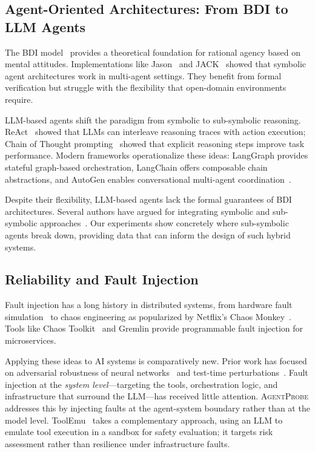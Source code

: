\documentclass[make,article,submit,moreauthors,pdftex]{mdpi}
\providecommand{\agentprobe}{\textsc{AgentProbe}}
\begin{document}
\subsection{Agent-Oriented Architectures: From BDI to LLM Agents}

The BDI model~\cite{rao1995bdi} provides a theoretical foundation for rational agency based on mental attitudes. Implementations like Jason~\cite{bordini2007programming} and JACK~\cite{winikoff2005jack} showed that symbolic agent architectures work in multi-agent settings. They benefit from formal verification but struggle with the flexibility that open-domain environments require.

LLM-based agents shift the paradigm from symbolic to sub-symbolic reasoning. ReAct~\cite{yao2023react} showed that LLMs can interleave reasoning traces with action execution; Chain of Thought prompting~\cite{wei2022chain} showed that explicit reasoning steps improve task performance. Modern frameworks operationalize these ideas: LangGraph provides stateful graph-based orchestration, LangChain offers composable chain abstractions, and AutoGen enables conversational multi-agent coordination~\cite{wu2023autogen}.

Despite their flexibility, LLM-based agents lack the formal guarantees of BDI architectures. Several authors have argued for integrating symbolic and sub-symbolic approaches~\cite{wooldridge2009introduction,garcez2023neurosymbolic}. Our experiments show concretely where sub-symbolic agents break down, providing data that can inform the design of such hybrid systems.

\subsection{Reliability and Fault Injection}

Fault injection has a long history in distributed systems, from hardware fault simulation~\cite{hsueh1997fault} to chaos engineering as popularized by Netflix's Chaos Monkey~\cite{basiri2016chaos}. Tools like Chaos Toolkit~\cite{chaostoolkit2024} and Gremlin provide programmable fault injection for microservices.

Applying these ideas to AI systems is comparatively new. Prior work has focused on adversarial robustness of neural networks~\cite{goodfellow2015explaining} and test-time perturbations~\cite{ribeiro2020beyond}. Fault injection at the \emph{system level}---targeting the tools, orchestration logic, and infrastructure that surround the LLM---has received little attention. \agentprobe{} addresses this by injecting faults at the agent-system boundary rather than at the model level. ToolEmu~\cite{ruan2024toolemu} takes a complementary approach, using an LLM to emulate tool execution in a sandbox for safety evaluation; it targets risk assessment rather than resilience under infrastructure faults.
\end{document}
